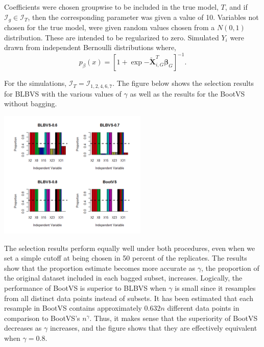 \documentclass[11pt]{article}
\begin{document}
Coefficients were chosen groupwise to be included in the true model, \(T\), and if \(\mathcal{I}_g \in \mathcal{I}_T\), then the corresponding parameter was given a value of 10. Variables not chosen for the true model, were given random values chosen from a \(N(0, 1)\) distribution. These are intended to be regularized to zero. Simulated \(Y_i\) were drawn from independent Bernoulli distributions where, $$p_\beta(x) = \left[1 + \exp{-\tilde{\mathbf{X}}^T_{i, G} \mathbf{\beta}_G} \right]^{-1}.$$

For the simulations, \(\mathcal{I}_T = \mathcal{I}_{1, 2, 4, 6, 7}\). The figure below shows the selection results for BLBVS with the various values of \(\gamma\) as well as the results for the BootVS without bagging.

\begin{center}
\includegraphics[width=.9\linewidth]{./simresults.png}
\end{center}

The selection results perform equally well under both procedures, even when we set a simple cutoff at being chosen in 50 percent of the replicates. The results show that the proportion estimate becomes more accurate as \(\gamma\), the proportion of the original dataset included in each bagged subset, increases. Logically, the performance of BootVS is superior to BLBVS when \(\gamma\) is small since it resamples from all distinct data points instead of subsets. It has been estimated that each resample in BootVS contains approximately \(0.632n\) different data points in comparison to BootVS's \(n^\gamma\). Thus, it makes sense that the superiority of BootVS decreases as \(\gamma\) increases, and the figure shows that they are effectively equivalent when \(\gamma = 0.8\).
\end{document}

